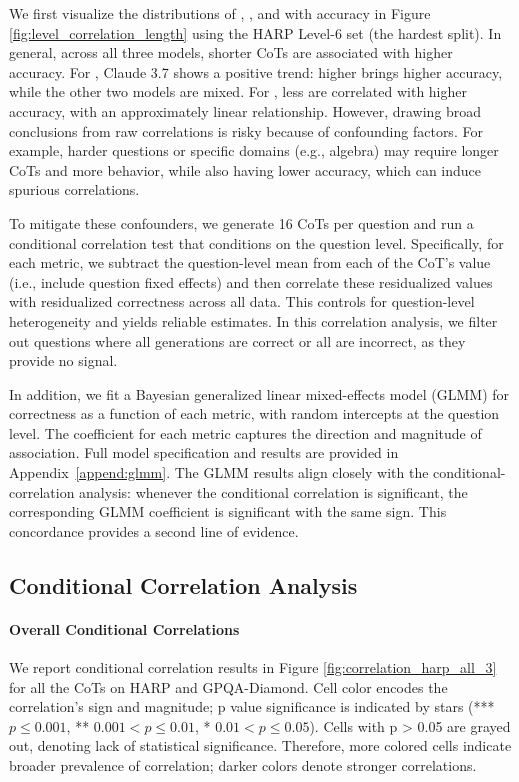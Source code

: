 We first visualize the distributions of \Length, \rr, and \fsf with accuracy in Figure \ref{fig:level_correlation_length} using the HARP Level-6 set (the hardest split). In general, across all three models, shorter CoTs are associated with higher accuracy. For \rr, Claude 3.7 shows a positive trend: higher \rr brings higher accuracy, while the other two models are mixed. For \fsf, less \fsf are correlated with higher accuracy, with an approximately linear relationship. However, drawing broad conclusions from raw correlations is risky because of confounding factors. For example, harder questions or specific domains (e.g., algebra) may require longer CoTs and more \Review behavior, while also having lower accuracy, which can induce spurious correlations.

To mitigate these confounders, we generate 16 CoTs per question and run a conditional correlation test that conditions on the question level. Specifically, for each metric, we subtract the question-level mean from each of the CoT’s value (i.e., include question fixed effects) and then correlate these residualized values with residualized correctness across all data. This controls for question-level heterogeneity and yields reliable estimates. In this correlation analysis, we filter out questions where all generations are correct or all are incorrect, as they provide no signal.

In addition, we fit a Bayesian generalized linear mixed-effects model (GLMM) for correctness as a function of each metric, with random intercepts at the question level. The coefficient for each metric captures the direction and magnitude of association. Full model specification and results are provided in Appendix~\ref{append:glmm}. The GLMM results align closely with the conditional-correlation analysis: whenever the conditional correlation is significant, the corresponding GLMM coefficient is significant with the same sign. This concordance provides a second line of evidence.

\subsection{Conditional Correlation Analysis}\label{sec:graph-result}


\paragraph{Overall Conditional Correlations} We report conditional correlation results in Figure \ref{fig:correlation_harp_all_3} for all the CoTs on HARP and GPQA-Diamond. Cell color encodes the correlation’s sign and magnitude; p value significance is indicated by stars (*** \(p\le0.001\), ** \(0.001< p\le0.01\), * \(0.01< p\le0.05\)). Cells with p > 0.05 are grayed out, denoting lack of statistical significance. Therefore, more colored cells indicate broader prevalence of correlation; darker colors denote stronger correlations.

